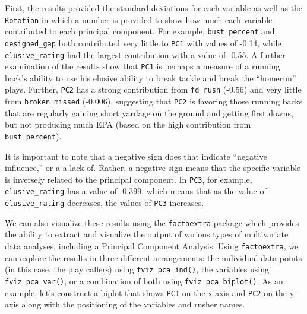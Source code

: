 \documentclass[
  letterpaper,
]{krantz}
\begin{document}
First, the results provided the standard deviations for each variable as
well as the \texttt{Rotation} in which a number is provided to show how
much each variable contributed to each principal component. For example,
\texttt{bust\_percent} and \texttt{designed\_gap} both contributed very
little to \texttt{PC1} with values of -0.14, while
\texttt{elusive\_rating} had the largest contribution with a value of
-0.55. A further examination of the results show that \texttt{PC1} is
perhaps a measure of a running back's ability to use his elusive ability
to break tackle and break the ``homerun'' plays. Further, \texttt{PC2}
has a strong contribution from \texttt{fd\_rush} (-0.56) and very little
from \texttt{broken\_missed} (-0.006), suggesting that \texttt{PC2} is
favoring those running backs that are regularly gaining short yardage on
the ground and getting first downs, but not producing much EPA (based on
the high contribution from \texttt{bust\_percent}).

\begin{tcolorbox}[enhanced jigsaw, colback=white, leftrule=.75mm, breakable, colframe=quarto-callout-note-color-frame, bottomtitle=1mm, rightrule=.15mm, left=2mm, opacityback=0, bottomrule=.15mm, arc=.35mm, coltitle=black, colbacktitle=quarto-callout-note-color!10!white, toptitle=1mm, titlerule=0mm, title=\textcolor{quarto-callout-note-color}{\faInfo}\hspace{0.5em}{Note}, toprule=.15mm, opacitybacktitle=0.6]

It is important to note that a negative sign does that indicate
``negative influence,'' or a a lack of. Rather, a negative sign means
that the specific variable is inversely related to the principal
component. In \texttt{PC3}, for example, \texttt{elusive\_rating} has a
value of -0.399, which means that as the value of
\texttt{elusive\_rating} decreases, the values of \texttt{PC3}
increases.

\end{tcolorbox}

We can also visualize these results using the \texttt{factoextra}
package which provides the ability to extract and visualize the output
of various types of multivariate data analyses, including a Principal
Component Analysis. Using \texttt{factoextra}, we can explore the
results in three different arrangements: the individual data points (in
this case, the play callers) using \texttt{fviz\_pca\_ind()}, the
variables using \texttt{fviz\_pca\_var()}, or a combination of both
using \texttt{fviz\_pca\_biplot()}. As an example, let's construct a
biplot that shows \texttt{PC1} on the x-axis and \texttt{PC2} on the
y-axis along with the positioning of the variables and rusher names.
\end{document}
